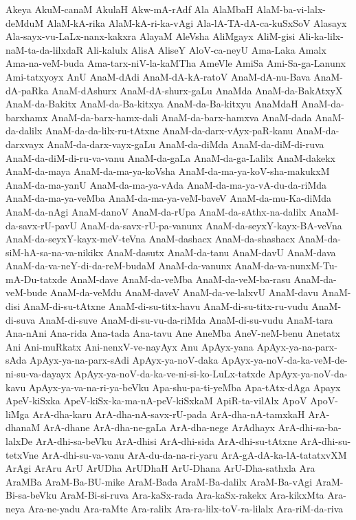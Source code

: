 {Akeya
AkuM-canaM
AkulaH
Akw-mA-rAdf
Ala
AlaMbaH
AlaM-ba-vi-lalx-deMduM
AlaM-kA-rika
AlaM-kA-ri-ka-vAgi
Ala-lA-TA-dA-ca-kuSxSoV
Alasayx
Ala-sayx-vu-LaLx-nanx-kakxra
AlayaM
AleVsha
AliMgayx
AliM-gisi
Ali-ka-lilx-naM-ta-da-lilxdaR
Ali-kalulx
AlisA
AliseY
AloV-ca-neyU
Ama-Laka
Amalx
Ama-na-veM-buda
Ama-tarx-niV-la-kaMTha
AmeVle
AmiSa
Ami-Sa-ga-Lanunx
Ami-tatxyoyx
AnU
AnaM-dAdi
AnaM-dA-kA-ratoV
AnaM-dA-nu-Bava
AnaM-dA-paRka
AnaM-dAshurx
AnaM-dA-shurx-gaLu
AnaMda
AnaM-da-BakAtxyX
AnaM-da-Bakitx
AnaM-da-Ba-kitxya
AnaM-da-Ba-kitxyu
AnaMdaH
AnaM-da-barxhamx
AnaM-da-barx-hamx-dali
AnaM-da-barx-hamxva
AnaM-dada
AnaM-da-dalilx
AnaM-da-da-lilx-ru-tAtxne
AnaM-da-darx-vAyx-paR-kanu
AnaM-da-darxvayx
AnaM-da-darx-vayx-gaLu
AnaM-da-diMda
AnaM-da-diM-di-ruva
AnaM-da-diM-di-ru-va-vanu
AnaM-da-gaLa
AnaM-da-ga-Lalilx
AnaM-dakekx
AnaM-da-maya
AnaM-da-ma-ya-koVsha
AnaM-da-ma-ya-koV-sha-makukxM
AnaM-da-ma-yanU
AnaM-da-ma-ya-vAda
AnaM-da-ma-ya-vA-du-da-riMda
AnaM-da-ma-ya-veMba
AnaM-da-ma-ya-veM-baveV
AnaM-da-mu-Ka-diMda
AnaM-da-nAgi
AnaM-danoV
AnaM-da-rUpa
AnaM-da-sAthx-na-dalilx
AnaM-da-savx-rU-pavU
AnaM-da-savx-rU-pa-vanunx
AnaM-da-seyxY-kayx-BA-veVna
AnaM-da-seyxY-kayx-meV-teVna
AnaM-dashacx
AnaM-da-shashacx
AnaM-da-siM-hA-sa-na-va-nikikx
AnaM-dasutx
AnaM-da-tanu
AnaM-davU
AnaM-dava
AnaM-da-va-neY-di-da-reM-budaM
AnaM-da-vanunx
AnaM-da-va-nunxM-Tu-mA-Du-tatxde
AnaM-dave
AnaM-da-veMba
AnaM-da-veM-ba-rasu
AnaM-da-veM-bude
AnaM-da-veMdu
AnaM-daveV
AnaM-da-ve-lalxvU
AnaM-davu
AnaM-disi
AnaM-di-su-tAtxne
AnaM-di-su-titx-havu
AnaM-di-su-titx-ru-vudu
AnaM-di-suva
AnaM-di-suve
AnaM-di-su-vu-da-riMda
AnaM-di-su-vudu
AnaM-tara
Ana-nAni
Ana-rida
Ana-tada
Ana-tavu
Ane
AneMba
AneV-neM-benu
Anetatx
Ani
Ani-muRkatx
Ani-nenxV-ve-nayAyx
Anu
ApAyx-yana
ApAyx-ya-na-parx-sAda
ApAyx-ya-na-parx-sAdi
ApAyx-ya-noV-daka
ApAyx-ya-noV-da-ka-veM-de-ni-su-va-dayayx
ApAyx-ya-noV-da-ka-ve-ni-si-ko-LuLx-tatxde
ApAyx-ya-noV-da-kavu
ApAyx-ya-va-na-ri-ya-beVku
Apa-shu-pa-ti-yeMba
Apa-tAtx-dAga
Apayx
ApeV-kiSxka
ApeV-kiSx-ka-ma-nA-peV-kiSxkaM
ApiR-ta-vilAlx
ApoV
ApoV-liMga
ArA-dha-karu
ArA-dha-nA-savx-rU-pada
ArA-dha-nA-tamxkaH
ArA-dhanaM
ArA-dhane
ArA-dha-ne-gaLa
ArA-dha-nege
ArAdhayx
ArA-dhi-sa-ba-lalxDe
ArA-dhi-sa-beVku
ArA-dhisi
ArA-dhi-sida
ArA-dhi-su-tAtxne
ArA-dhi-su-tetxVne
ArA-dhi-su-va-vanu
ArA-du-da-na-ri-yaru
ArA-gA-dA-ka-lA-tatatxvXM
ArAgi
ArAru
ArU
ArUDha
ArUDhaH
ArU-Dhana
ArU-Dha-sathxla
Ara
AraMBa
AraM-Ba-BU-mike
AraM-Bada
AraM-Ba-dalilx
AraM-Ba-vAgi
AraM-Bi-sa-beVku
AraM-Bi-si-ruva
Ara-kaSx-rada
Ara-kaSx-rakekx
Ara-kikxMta
Ara-neya
Ara-ne-yadu
Ara-raMte
Ara-ralilx
Ara-ra-lilx-toV-ra-lilalx
Ara-riM-da-riva
}
